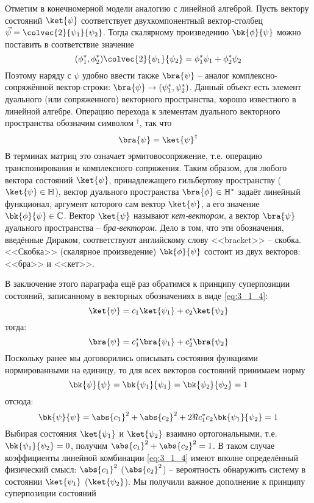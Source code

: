 Отметим в конечномерной модели аналогию с линейной алгеброй. Пусть вектору состояний $\ket{\psi}$ соответствует двухкомпонентный вектор-столбец $\vec{\psi} = \colvec{2}{\psi_1}{\psi_2}$. Тогда скалярному произведению $\bk{\phi}{\psi}$ можно поставить в соответствие значение%
%
$$
(\phi_1^*, \phi_2^*) \colvec{2}{\psi_1}{\psi_2} = \phi_1^*\psi_1 + \phi_2^* \psi_2
$$%
%
Поэтому наряду с $\psi$ удобно ввести также $\bra{\psi}$ -- аналог комплексно-сопряжённой вектор-строки: $\bra{\psi} \to (\psi_1^*, \psi_2^*)$. Данный объект есть элемент дуального (или сопряженного) векторного пространства, хорошо известного в линейной алгебре. Операцию перехода к элементам дуального векторного пространства обозначим символом $^\dag$, так что%
%
$$
\bra{\psi} = \ket{\psi}^\dag
$$%
%
В терминах матриц это означает эрмитово\footnotemark сопряжение, т.е. операцию транспонирования и комплексного сопряжения. Таким образом, для любого вектора состояний $\ket{\psi}$, принадлежащего гильбертову пространству ($\ket{\psi} \in \mathbb{H}$), вектор дуального пространства $\bra{\phi} \in \mathbb{H}^*$ задаёт линейный функционал, аргумент которого сам вектор $\ket{\psi}$, а его значение $\bk{\phi}{\psi} \in \mathbb{C}$.
%
Вектор $\ket{\psi}$ называют {\em кет-вектором}, а вектор $\bra{\psi}$ дуального пространства -- {\em бра-вектором}. Дело в том, что эти обозначения, введённые Дираком, соответствуют английскому слову <<bracket>> -- скобка. <<Скобка>> (скалярное произведение) $\bk{\phi}{\psi}$ состоит из двух векторов: <<бра>> и <<кет>>.

В заключение этого параграфа ещё раз обратимся к принципу суперпозиции состояний, записанному в векторных обозначениях в виде \eqref{eq:3_1_4}:%
%
$$
\ket{\psi} = c_1 \ket{\psi_1} + c_2 \ket{\psi_2}
$$%
%
тогда:%
%
$$
\bra{\psi} = c_1^* \bra{\psi_1} + c_2^* \bra{\psi_2}
$$%
%
Поскольку ранее мы договорились описывать состояния функциями нормированными на единицу, то для всех векторов состояний принимаем норму%
%
$$
\bk{\psi}{\psi} = \bk{\psi_1}{\psi_1} = \bk{\psi_2}{\psi_2} = 1
$$%
%
отсюда:%
%
$$
\bk{\psi}{\psi} = \abs{c_1}^2 + \abs{c_2}^2 + 2 \Re{c_1^* c_2 \bk{\psi_1}{\psi_2}} = 1
$$%
%
Выбирая состояния $\ket{\psi_1}$ и $\ket{\psi_2}$ взаимно ортогональными, т.е. $\bk{\psi_1}{\psi_2} = 0$, получим $\abs{c_1}^2 + \abs{c_2}^2 = 1$. В таком случае коэффициенты линейной комбинации \eqref{eq:3_1_4} имеют вполне определённый физический смысл: $\abs{c_1}^2$ ($\abs{c_2}^2$) -- вероятность обнаружить систему в состоянии $\ket{\psi_1}$ ($\ket{\psi_2}$). Мы получили важное дополнение к принципу суперпозиции состояний

